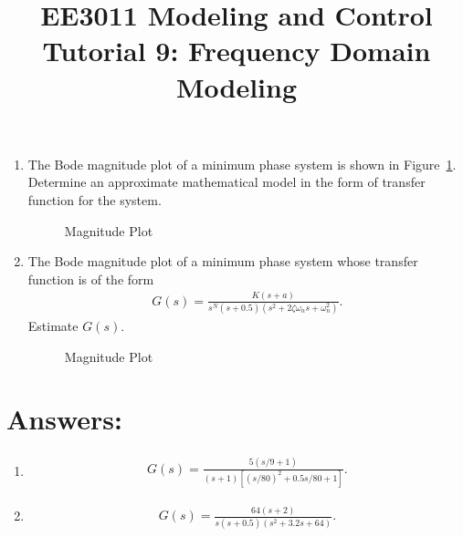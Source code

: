 \documentclass{article}
\title{EE3011 Modeling and Control\\Tutorial 9: Frequency Domain Modeling}
\date{}
\newcommand{\tikzdir}[1]{tikz/#1.tikz}
\newcommand{\inputtikz}[1]{}}
\begin{document}
 \maketitle

\begin{enumerate}
\item The Bode magnitude plot of a minimum phase system is shown in Figure~\ref{fig:1}. Determine an approximate mathematical model in the form of transfer function for the system.
  \begin{figure}[ht]
    \centering
    \inputtikz{Tut91}
    \caption{Magnitude Plot\label{fig:1}}
  \end{figure}
  \newpage
\item The Bode magnitude plot of a minimum phase system whose transfer function is of the form
  \begin{align*}
    G(s) = \frac{K(s+a)}{s^N(s+0.5)(s^2+2\zeta\omega_n s+\omega_n^2)}.
  \end{align*}
  Estimate $G(s)$.


  \begin{figure}[ht]
    \centering
    \inputtikz{Tut92}
    \caption{Magnitude Plot\label{fig:2}}
  \end{figure}
\end{enumerate}
\newpage

\section*{Answers:}
\begin{enumerate}
\item
  \begin{align*}
    G(s)=\frac{5(s/9+1)}{(s+1)\left[(s/80)^2+0.5s/80+1\right]}.
  \end{align*}
\item
  \begin{align*}
    G(s) = \frac{64(s+2)}{s(s+0.5)(s^2+3.2 s+64)}.
  \end{align*}
\end{enumerate}
\end{document}
